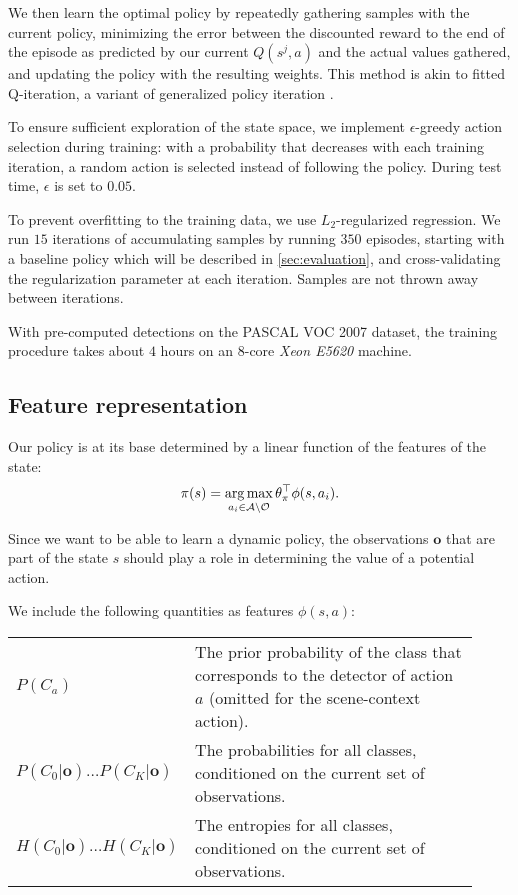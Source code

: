 We then learn the optimal policy by repeatedly gathering samples with the current policy, minimizing the error between the discounted reward to the end of the episode as predicted by our current $Q(s^j,a)$ and the actual values gathered, and updating the policy with the resulting weights.
This method is akin to fitted Q-iteration, a variant of generalized policy iteration \cite{Ernst2005,Sutton1998}.

To ensure sufficient exploration of the state space, we implement $\epsilon$-greedy action selection during training: with a probability that decreases with each training iteration, a random action is selected instead of following the policy.
During test time, $\epsilon$ is set to $0.05$.

To prevent overfitting to the training data, we use $L_2$-regularized regression.
We run $15$ iterations of accumulating samples by running $350$ episodes, starting with a baseline policy which will be described in \autoref{sec:evaluation}, and cross-validating the regularization parameter at each iteration.
Samples are not thrown away between iterations.

With pre-computed detections on the PASCAL VOC 2007 dataset, the training procedure takes about $4$ hours on an $8$-core \emph{Xeon E5620} machine.

\subsection{Feature representation}
Our policy is at its base determined by a linear function of the features of the state:
\begin{align}
\pi(s) = \operatorname*{arg\,max}_{a_i \in \mathcal{A} \setminus \mathcal{O}} \theta_\pi^\top \phi(s,a_i).
\end{align}

Since we want to be able to learn a dynamic policy, the observations $\mathbf{o}$ that are part of the state $s$ should play a role in determining the value of a potential action.

We include the following quantities as features $\phi(s,a)$:

\begin{tabularx}{0.8\linewidth}{p{0.23\linewidth}p{0.69\linewidth}}
$P(C_a)$ & The prior probability of the class that corresponds to the detector of action $a$ (omitted for the scene-context action).\\
$P(C_0|\mathbf{o}) \ldots P(C_K|\mathbf{o})$ & The probabilities for all classes, conditioned on the current set of observations.\\
$H(C_0|\mathbf{o}) \ldots H(C_K|\mathbf{o})$ & The entropies for all classes, conditioned on the current set of observations. \\
\end{tabularx}

